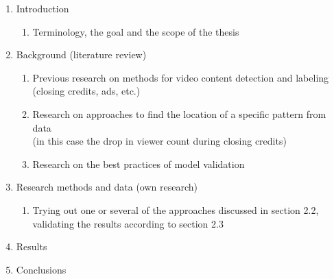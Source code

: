 \documentclass[12pt,a4paper,english,oneside]{article}
\begin{document}
\begin{enumerate}
\item Introduction 
\begin{enumerate}[label=${}$]
    \item Terminology, the goal and the scope of the thesis
\end{enumerate}
\item Background (literature review) 
    \begin{enumerate}
    \item Previous research on methods for video content detection and labeling
    \\(closing credits, ads, etc.)
    \item Research on approaches to find the location of a specific pattern from data
    \\(in this case the drop in viewer count during closing credits)
    \item Research on the best practices of model validation
    \end{enumerate}
\item Research methods and data (own research)
\begin{enumerate}[label=${}$]
    \item Trying out one or several of the approaches discussed in section 2.2,
    \\validating the results according to section 2.3
\end{enumerate}
\item Results
\item Conclusions
\end{enumerate}

%


% 

\renewcommand{\refname}{References}  %

%

\end{document}
